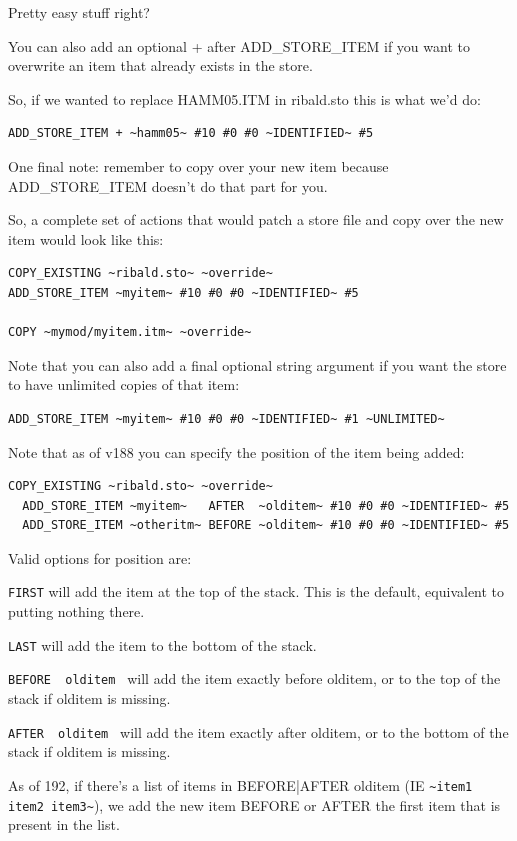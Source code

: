 \documentclass{article}
\def\t#1{{\tt #1}}
\begin{document}
  Pretty easy stuff right?

  You can also add an optional + after ADD_STORE_ITEM if you want to
  overwrite an item that already exists in the store.

  So, if we wanted to replace HAMM05.ITM in ribald.sto this is what we'd
  do:

\begin{verbatim}
ADD_STORE_ITEM + ~hamm05~ #10 #0 #0 ~IDENTIFIED~ #5
\end{verbatim}

  One final note: remember to copy over your new item because
  ADD_STORE_ITEM doesn't do that part for you.

  So, a complete set of actions that would patch a store file and copy over
  the new item would look like this:

\begin{verbatim}
COPY_EXISTING ~ribald.sto~ ~override~
ADD_STORE_ITEM ~myitem~ #10 #0 #0 ~IDENTIFIED~ #5

COPY ~mymod/myitem.itm~ ~override~
\end{verbatim}

  Note that you can also add a final optional string argument if you want
  the store to have unlimited copies of that item:

\begin{verbatim}
ADD_STORE_ITEM ~myitem~ #10 #0 #0 ~IDENTIFIED~ #1 ~UNLIMITED~
\end{verbatim}

Note that as of v188 you can specify the position of the item being added:
\begin{verbatim}
COPY_EXISTING ~ribald.sto~ ~override~
  ADD_STORE_ITEM ~myitem~   AFTER  ~olditem~ #10 #0 #0 ~IDENTIFIED~ #5
  ADD_STORE_ITEM ~otheritm~ BEFORE ~olditem~ #10 #0 #0 ~IDENTIFIED~ #5
\end{verbatim}
  Valid options for position are:

  \t{FIRST} will add the item at the top of the stack.
     This is the default, equivalent to putting nothing there.

  \t{LAST} will add the item to the bottom of the stack.

  \t{BEFORE ~olditem~} will add the item exactly before olditem,
    or to the top of the stack if olditem is missing.

  \t{AFTER  ~olditem~} will add the item exactly after olditem,
    or to the bottom of the stack if olditem is missing.

As of 192, if there's a list of items in BEFORE|AFTER olditem (IE \verb+~item1 item2 item3~+),
we add the new item BEFORE or AFTER the first item that is present in the list.
\end{document}

